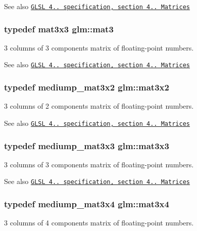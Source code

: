 \begin{DoxySeeAlso}{\-See also}
\href{http://www.opengl.org/registry/doc/GLSLangSpec.4.20.8.pdf}{\tt \-G\-L\-S\-L 4.. specification, section 4.. \-Matrices} 
\end{DoxySeeAlso}
\hypertarget{group__core__types_gadfaff2a7dce5cbf4e77a47ecea42ac5b}{
\subsubsection[{mat3}]{\setlength{\rightskip}{0pt plus 5cm}typedef mat3x3 {\bf glm\-::mat3}}}\label{group__core__types_gadfaff2a7dce5cbf4e77a47ecea42ac5b}
3 columns of 3 components matrix of floating-\/point numbers.

\begin{DoxySeeAlso}{\-See also}
\href{http://www.opengl.org/registry/doc/GLSLangSpec.4.20.8.pdf}{\tt \-G\-L\-S\-L 4.. specification, section 4.. \-Matrices} 
\end{DoxySeeAlso}
\hypertarget{group__core__types_gae38fe62de819d214ac89f1f4df343844}{
\subsubsection[{mat3x2}]{\setlength{\rightskip}{0pt plus 5cm}typedef mediump\-\_\-mat3x2 {\bf glm\-::mat3x2}}}\label{group__core__types_gae38fe62de819d214ac89f1f4df343844}
3 columns of 2 components matrix of floating-\/point numbers.

\begin{DoxySeeAlso}{\-See also}
\href{http://www.opengl.org/registry/doc/GLSLangSpec.4.20.8.pdf}{\tt \-G\-L\-S\-L 4.. specification, section 4.. \-Matrices} 
\end{DoxySeeAlso}
\hypertarget{group__core__types_gae01cfe70eb34df727346f82c7c08acd7}{
\subsubsection[{mat3x3}]{\setlength{\rightskip}{0pt plus 5cm}typedef mediump\-\_\-mat3x3 {\bf glm\-::mat3x3}}}\label{group__core__types_gae01cfe70eb34df727346f82c7c08acd7}
3 columns of 3 components matrix of floating-\/point numbers.

\begin{DoxySeeAlso}{\-See also}
\href{http://www.opengl.org/registry/doc/GLSLangSpec.4.20.8.pdf}{\tt \-G\-L\-S\-L 4.. specification, section 4.. \-Matrices} 
\end{DoxySeeAlso}
\hypertarget{group__core__types_ga75499a515649f0db9593beb23ab084a5}{
\subsubsection[{mat3x4}]{\setlength{\rightskip}{0pt plus 5cm}typedef mediump\-\_\-mat3x4 {\bf glm\-::mat3x4}}}\label{group__core__types_ga75499a515649f0db9593beb23ab084a5}
3 columns of 4 components matrix of floating-\/point numbers.

